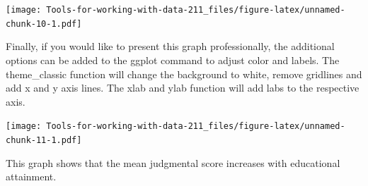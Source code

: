 \documentclass[
]{book}
\newenvironment{Shaded}{\begin{snugshade}}{\end{snugshade}}
\newcommand{\DataTypeTok}[1]{\textcolor[rgb]{0.13,0.29,0.53}{#1}}
\newcommand{\FloatTok}[1]{\textcolor[rgb]{0.00,0.00,0.81}{#1}}
\newcommand{\KeywordTok}[1]{\textcolor[rgb]{0.13,0.29,0.53}{\textbf{#1}}}
\newcommand{\NormalTok}[1]{#1}
\newcommand{\OperatorTok}[1]{\textcolor[rgb]{0.81,0.36,0.00}{\textbf{#1}}}
\newcommand{\StringTok}[1]{\textcolor[rgb]{0.31,0.60,0.02}{#1}}
\begin{document}
\texttt{[image: Tools-for-working-with-data-211\_files/figure-latex/unnamed-chunk-10-1.pdf]}

Finally, if you would like to present this graph professionally, the additional options can be added to the ggplot command to adjust color and labels. The theme\_classic function will change the background to white, remove gridlines and add x and y axis lines. The xlab and ylab function will add labs to the respective axis.

\begin{Shaded}
\end{Shaded}

\texttt{[image: Tools-for-working-with-data-211\_files/figure-latex/unnamed-chunk-11-1.pdf]}

This graph shows that the mean judgmental score increases with educational attainment.

  
\end{document}
